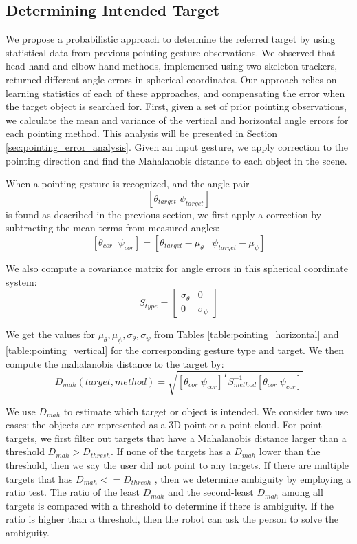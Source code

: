 \documentclass[12pt]{gatech-thesis}
\begin{document}
\subsection{Determining Intended Target}
\label{sec:pointing_determining_intended_target}

We propose a probabilistic approach to determine the referred target by using statistical data from previous pointing gesture observations. We observed that head-hand and elbow-hand methods, implemented using two skeleton trackers, returned different angle errors in spherical coordinates. Our approach relies on learning statistics of each of these approaches, and compensating the error when the target object is searched for. First, given a set of prior pointing observations, we calculate the mean and variance of the vertical and horizontal angle errors for each pointing method. This analysis will be presented in Section \ref{sec:pointing_error_analysis}. Given an input gesture, we apply correction to the pointing direction and find the Mahalanobis distance to each object in the scene.

When a pointing gesture is recognized, and the angle pair $$[\theta_{target}\;\psi_{target}]$$ is found as described in the previous section, we first apply a correction by subtracting the mean terms from measured angles:
$$[\theta_{cor}\;\;\psi_{cor}]=[\theta_{target}-\mu_{\theta}\;\;\;\psi_{target}-\mu_{\psi}]$$
 
We also compute a covariance matrix for angle errors in this spherical coordinate system: 
$$S_{type} = \begin{bmatrix}
\sigma_{\theta}&0\\ 0&\sigma_{\psi}
\end{bmatrix} $$

We get the values for $\mu_{\theta}, \mu_{\psi}, \sigma_{\theta} ,\sigma_{\psi}$ from Tables \ref{table:pointing_horizontal} and \ref{table:pointing_vertical} for the corresponding gesture type and target. We then compute the mahalanobis distance to the target by:
$$D_{mah}(target,method)=\sqrt{ [\theta_{cor}\;\psi_{cor}]^T S_{method}^{-1} [\theta_{cor}\;\psi_{cor}]}$$
 
We use $D_{mah}$ to estimate which target or object is intended. We consider two use cases: the objects are represented as a 3D point or a point cloud. For point targets, we first filter out targets that have a Mahalanobis distance larger than a threshold $D_{mah} > D_{thresh}$. If none of the targets has a $D_{mah}$ lower than the threshold, then we say the user did not point to any targets. If there are multiple targets that has $D_{mah} <= D_{thresh}$ , then we determine ambiguity by employing a ratio test. The ratio of the least $D_{mah}$ and the second-least $D_{mah}$ among all targets is compared with a threshold to determine if there is ambiguity. If the ratio is higher than a threshold, then the robot can ask the person to solve the ambiguity.
\end{document}
